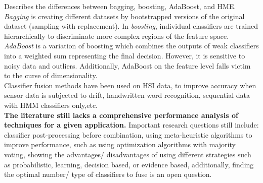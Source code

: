 \documentclass[]{article}
\begin{document}
			\noindent
			Describes the differences between bagging, boosting, AdaBoost, and HME. \textit{Bagging} is creating different datasets by bootstrapped versions of the original dataset (sampling with replacement).  In \textit{boosting}, individual classifiers are trained hierarchically to discriminate more complex regions of the feature space.  \textit{AdaBoost} is a variation of boosting which combines the outputs of weak classifiers into a weighted sum representing the final decision.  However, it is sensitive to noisy data and outliers.  Additionally, AdaBoost on the feature level falls victim to the curse of dimensionality.\\  
			\noindent
			Classifier fusion methods have been used on HSI data, to improve  accuracy when sensor data is subjected to drift, handwritten word recognition, sequential data with HMM classifiers only,etc. \\
			\noindent
			\textbf{The literature still lacks a comprehensive performance analysis of techniques for a given application.}  Important research questions still include: classifier post-processing before combination, using meta-heuristic algorithms to improve performance, such as using optimization algorithms with majority voting, showing the advantages/ disadvantages of using different strategies such as probabilistic, learning, decision based, or evidence based, additionally, finding the optimal number/ type of classifiers to fuse is an open question. \\
			
\end{document}
